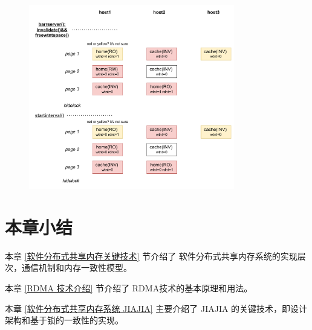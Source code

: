 {\begin{enumerate}[label=\arabic*.]
              \begin{figure}[!htbp]
                  \centering
                  \includegraphics[width=0.8\textwidth]{Img/jiajia_barrier_sync2.drawio.pdf}
                  \label{fig:JIAJIA-barrier2}
              \end{figure}
    \end{enumerate}

    \section{本章小结}

    本章 \ref{软件分布式共享内存关键技术} 节介绍了 软件分布式共享内存系统的实现层次，通信机制和内存一致性模型。

    本章 \ref{RDMA 技术介绍} 节介绍了 RDMA技术的基本原理和用法。

    本章 \ref{软件分布式共享内存系统 JIAJIA} 主要介绍了 JIAJIA 的关键技术，即设计架构和基于锁的一致性的实现。
}